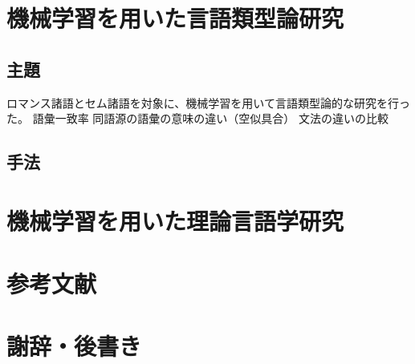 \documentclass[12pt, oneside]{book} %
\begin{document}
\part{機械学習を用いた言語類型論研究}
\chapter{主題}
ロマンス諸語とセム諸語を対象に、機械学習を用いて言語類型論的な研究を行った。
語彙一致率
同語源の語彙の意味の違い（空似具合）
文法の違いの比較
\chapter{手法}
\part{機械学習を用いた理論言語学研究}
\part{参考文献}
\part{謝辞・後書き}
\end{document}
